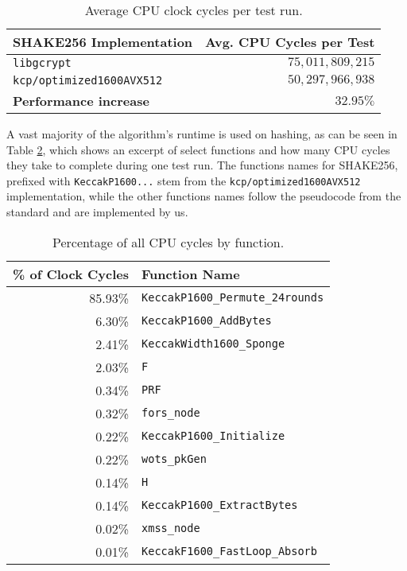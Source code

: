 \documentclass[journal=tosc,notanonymous]{iacrtrans}
\begin{document}
\begin{table}[ht]
\centering
\begin{tabular}{ l | r }
    \textbf{SHAKE256 Implementation} & \textbf{Avg. CPU Cycles per Test} \\
    \hline
    \texttt{libgcrypt} & $75,011,809,215$ \\
    \texttt{kcp/optimized1600AVX512} & $50,297,966,938$ \\
    \hline
    \textbf{Performance increase} & $32.95\%$
\end{tabular}
     \caption{\label{tab:cycles}Average CPU clock cycles per test run.}
\end{table}

A vast majority of the algorithm's runtime is used on hashing, as can be seen in Table \ref{tab:perf}, which shows an excerpt of select functions and how many CPU cycles they take to complete during one test run.
The functions names for SHAKE256, prefixed with \texttt{KeccakP1600...} stem from the \texttt{kcp/optimized1600AVX512} implementation, while the other functions names follow the pseudocode from the standard and are implemented by us.

\begin{table}[ht]
\centering
\begin{tabular}{ r | l }
    \textbf{\% of Clock Cycles} & \textbf{Function Name} \\
    \hline
    85.93\% & \texttt{KeccakP1600\_Permute\_24rounds} \\
     6.30\% & \texttt{KeccakP1600\_AddBytes} \\
     2.41\% & \texttt{KeccakWidth1600\_Sponge} \\
     2.03\% & \texttt{F} \\
     0.34\% & \texttt{PRF} \\
     0.32\% & \texttt{fors\_node} \\
     0.22\% & \texttt{KeccakP1600\_Initialize} \\
     0.22\% & \texttt{wots\_pkGen} \\
     0.14\% & \texttt{H} \\
     0.14\% & \texttt{KeccakP1600\_ExtractBytes} \\
     0.02\% & \texttt{xmss\_node} \\
     0.01\% & \texttt{KeccakF1600\_FastLoop\_Absorb}
\end{tabular}
     \caption{\label{tab:perf}Percentage of all CPU cycles by function.}
\end{table}
\end{document}
